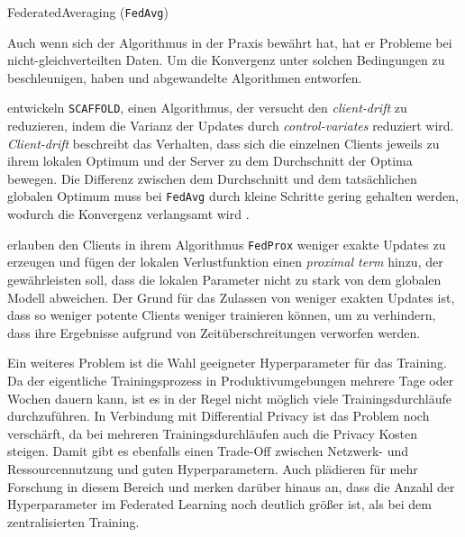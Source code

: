 \begin{algorithm}[tb]
	\caption{FederatedAveraging (\texttt{FedAvg})}
	\label{alg:fedavg}
\end{algorithm}

Auch wenn sich der Algorithmus in der Praxis bewährt hat\cite{hard:2018, ramaswamy:2020}, hat er Probleme bei nicht-gleichverteilten Daten. Um die Konvergenz unter solchen Bedingungen zu beschleunigen, haben \textcite{karimireddy:2020} und \textcite{li:2020} abgewandelte Algorithmen entworfen.

\textcite{karimireddy:2020} entwickeln \texttt{SCAFFOLD}, einen Algorithmus, der versucht den \textit{client-drift} zu reduzieren, indem die Varianz der Updates durch \textit{control-variates} reduziert wird. \textit{Client-drift} beschreibt das Verhalten, dass sich die einzelnen Clients jeweils zu ihrem lokalen Optimum und der Server zu dem Durchschnitt der Optima bewegen. Die Differenz zwischen dem Durchschnitt und dem tatsächlichen globalen Optimum muss bei \texttt{FedAvg} durch kleine Schritte gering gehalten werden, wodurch die Konvergenz verlangsamt wird \parencite[p.4]{karimireddy:2020}.

\textcite{li:2020} erlauben den Clients in ihrem Algorithmus \texttt{FedProx} weniger exakte Updates zu erzeugen und fügen der lokalen Verlustfunktion einen \textit{proximal term} hinzu, der gewährleisten soll, dass die lokalen Parameter nicht zu stark von dem globalen Modell abweichen. Der Grund für das Zulassen von weniger exakten Updates ist, dass so weniger potente Clients weniger trainieren können, um zu verhindern, dass ihre Ergebnisse aufgrund von Zeitüberschreitungen verworfen werden.

Ein weiteres Problem ist die Wahl geeigneter Hyperparameter für das Training. Da der eigentliche Trainingsprozess in Produktivumgebungen mehrere Tage\cite[p.5]{hard:2018} oder Wochen\cite[p.4]{ramaswamy:2020} dauern kann, ist es in der Regel nicht möglich viele Trainingsdurchläufe durchzuführen. In Verbindung mit Differential Privacy ist das Problem noch verschärft, da bei mehreren Trainingsdurchläufen auch die Privacy Kosten steigen. Damit gibt es ebenfalls einen Trade-Off zwischen Netzwerk- und Ressourcennutzung und guten Hyperparametern. Auch \textcite[p.31]{kairouz:2021} plädieren für mehr Forschung in diesem Bereich und merken darüber hinaus an, dass die Anzahl der Hyperparameter im Federated Learning noch deutlich größer ist, als bei dem zentralisierten Training.

